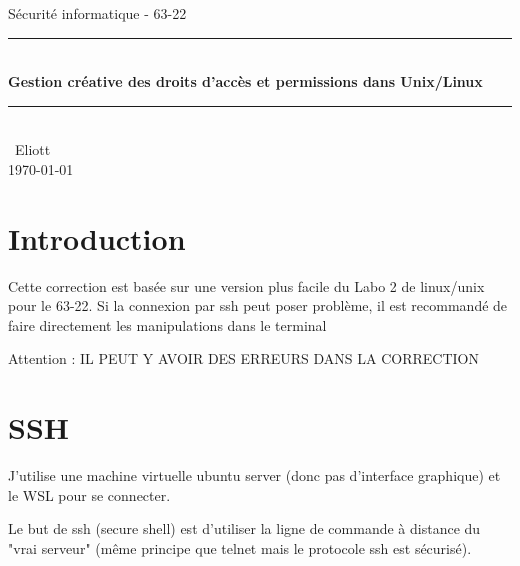 \documentclass[a4paper,11pt]{article}
\def \nom {Wiggins} %
\def \prenom {\ Eliott} %
\def \labo {Gestion créative des droits d’accès et
	permissions dans Unix/Linux} %
\begin{document}
	
	\renewcommand{\tablename}{Tableau} %
	\renewcommand{\figurename}{Figure} %
	\setlength{\parindent}{0pt}
	

	\begin{titlepage}
		\thispagestyle{titlestyle}
		\newcommand{\HRule}{\rule{\linewidth}{0.2mm}} %
		\begin{center} %
		{\Large Sécurité informatique - 63-22} \\[1.5cm]
		\HRule \\[0.6cm]
		
		{\huge \bfseries \labo}\\[0.4cm] %
		\HRule \\[1.5cm]
		{\Large \prenom \ \bsc{\nom}}\\[0.2cm] %
		{\large \today}\\[2cm] %
		\vfill %
		\setcounter{page}{1}
		\end{center}
	\end{titlepage}
	
	
	\pagestyle{fancy}
	\setcounter{page}{2} %
	\tableofcontents
	\newpage
	
	
	
	
	
	\section{Introduction }
	Cette correction est basée sur une version plus facile du Labo 2 de linux/unix pour le 63-22. Si la connexion par ssh peut poser problème, il est recommandé de faire directement les manipulations dans le terminal
	
	Attention : IL PEUT Y AVOIR DES ERREURS DANS LA CORRECTION
	\section{SSH}
	J'utilise une machine virtuelle ubuntu server (donc pas d'interface graphique) et le WSL pour se connecter. 
	
	Le but de ssh (secure shell) est d'utiliser la ligne de commande à distance du "vrai serveur" (même principe que telnet mais le protocole ssh est sécurisé).
	
\end{document}
